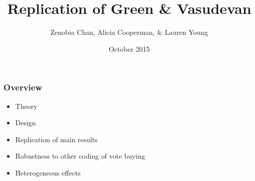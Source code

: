 \documentclass{beamer}
\institute{Columbia University}
\begin{document}
\title[SSDS]{Replication of Green \& Vasudevan}
\author{Zenobia Chan, Alicia Cooperman, \& Lauren Young}
\date{October 2015}

\begin{frame}
\titlepage
\end{frame}



\begin{frame}
\frametitle{Overview}

\begin{itemize}
\item Theory
\item Design
\item Replication of main results
\item Robustness to other coding of vote buying
\item Heterogeneous effects
\end{itemize}

\end{frame}
\end{document}
